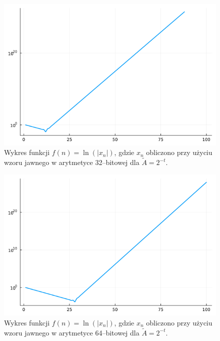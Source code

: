 \documentclass{article}
\begin{document}

\begin{figure}[!h]
    \centering
    \includegraphics[scale=0.4]{plot32_log_3.png}
    \caption{Wykres funkcji \(f(n) = \ln(|x_n|)\), gdzie \(x_n\) obliczono przy użyciu wzoru jawnego w arytmetyce 32--bitowej dla \(\tilde{A} = 2^{-t}\).}
    \label{fig:plot32_log_3}
\end{figure}

\begin{figure}[!h]
    \centering
    \includegraphics[scale=0.4]{plot64_log_3.png}
    \caption{Wykres funkcji \(f(n) = \ln(|x_n|)\), gdzie \(x_n\) obliczono przy użyciu wzoru jawnego w arytmetyce 64--bitowej dla \(\tilde{A} = 2^{-t}\).}
    \label{fig:plot64_log_3}
\end{figure}
\end{document}
